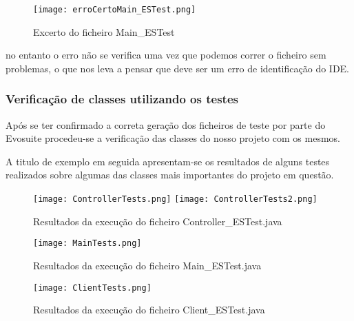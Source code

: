\begin{figure}[H]

  \centering

  \texttt{[image: erroCertoMain\_ESTest.png]}

  \caption {Excerto do ficheiro Main\_ESTest}

  \label {fig38}

\end{figure}

\par no entanto o erro não se verifica uma vez que podemos correr o ficheiro sem problemas, o que nos leva a pensar que deve ser um erro de identificação do IDE.

\subsubsection{Verificação de classes utilizando os testes}

\par Após se ter confirmado a correta geração dos ficheiros de teste por parte do Evosuite procedeu-se a verificação das classes do nosso projeto com os mesmos.
\par A titulo de exemplo em seguida apresentam-se os resultados de alguns testes realizados sobre algumas das classes mais importantes do projeto em questão.

\begin{figure}[H]

  \centering

  \texttt{[image: ControllerTests.png]}
  \texttt{[image: ControllerTests2.png]}
  \caption {Resultados da execução do ficheiro Controller\_ESTest.java}

  \label {fig39}

\end{figure}
\begin{figure}[H]

  \centering

  \texttt{[image: MainTests.png]}

  \caption {Resultados da execução do ficheiro Main\_ESTest.java}

  \label {fig40}

\end{figure}
\begin{figure}[H]

  \centering

  \texttt{[image: ClientTests.png]}

  \caption {Resultados da execução do ficheiro Client\_ESTest.java}

  \label {fig41}

\end{figure}

